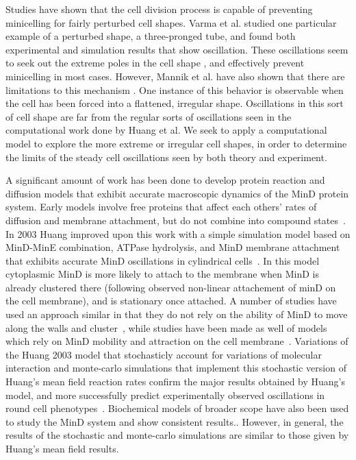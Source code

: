 \documentclass[letterpaper,twocolumn,amsmath,amssymb,pre]{revtex4-1}
\begin{document}
Studies have shown that the cell division process is capable of
preventing minicelling for fairly perturbed cell
shapes\cite{touhami2006temperature}. Varma et al. studied one
particular example of a perturbed shape, a three-pronged tube, and
found both experimental and simulation results\cite{varma2008min} that
show oscillation. These oscillations seem to seek out the extreme
poles in the cell shape\cite{corbin2002exploring}
\cite{juarez2010changes}, and effectively prevent minicelling in most
cases. However, Mannik et al. have also shown that there are
limitations to this mechanism\cite{mannik2010bacteria}
\cite{mannik2009bacterial}. One instance of this behavior is
observable when the cell has been forced into a flattened, irregular
shape. Oscillations in this sort of cell shape are far from the
regular sorts of oscillations seen in the computational work done by
Huang et al\cite{huang2003dynamic}. We seek to apply a computational
model to explore the more extreme or irregular cell shapes, in order
to determine the limits of the steady cell oscillations seen by both
theory and experiment.

A significant amount of work has been done to develop protein reaction
and diffusion models that exhibit accurate macroscopic dynamics of the
MinD protein system. Early models involve free proteins that affect
each others' rates of diffusion and membrane attachment, but do not
combine into compound states~\cite{meinhardt2001pattern}.  In 2003
Huang improved upon this work with a simple simulation model based on
MinD-MinE combination, ATPase hydrolysis, and MinD membrane attachment
that exhibits accurate MinD oscillations in
cylindrical cells~\cite{huang2003dynamic}. In this model cytoplasmic
MinD is more likely to attach to the membrane when MinD is already
clustered there (following observed non-linear attachement of minD on
the cell membrane), and is stationary once attached.  A number of
studies have used an approach similar in that they do not rely on the
ability of MinD to move along the walls and
cluster~\cite{kruse2007experimentalist, meinhardt2001pattern,
  drew2005polymerization, fange2006noise, kerr2006division}, while
studies have been made as well of models which rely on MinD mobility
and attraction on the cell membrane~\cite{kruse2002dynamic,
  howard2005cellular}.  Variations of the Huang 2003 model that
stochasticly account for variations of molecular interaction
\cite{fange2006noise} and monte-carlo simulations that implement this
stochastic version of Huang's mean field reaction rates confirm the
major results obtained by Huang's model, and more successfully predict
experimentally observed oscillations in round cell
phenotypes~\cite{drew2005polymerization, fange2006noise,
  huang2004min}. Biochemical models of broader scope have also been
used to study the MinD system and show consistent
results.\cite{arjunan2010new}.  However, in general, the results of
the stochastic and monte-carlo simulations are similar to those given
by Huang's mean field results.
\end{document}
